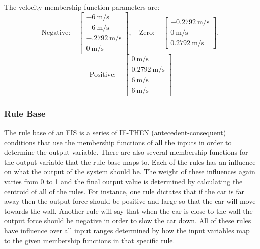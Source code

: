 The velocity membership function parameters are: \begin{displaymath} \mathrm{Negative:}\quad
\begin{bmatrix}
\SI{-6}{\metre\per\second}\\\SI{-6}{\metre\per\second}\\\SI{-.2792}{\metre\per\second}\\\SI{0}{\metre\per\second}
\end{bmatrix}, \quad \mathrm{Zero:}\quad \begin{bmatrix}
    \SI{-0.2792}{\metre\per\second}\\\SI{0}{\metre\per\second}\\\SI{0.2792}{\metre\per\second} \end{bmatrix},
\end{displaymath} \begin{displaymath} \mathrm{Positive:}\quad \begin{bmatrix}
\SI{0}{\metre\per\second}\\\SI{0.2792}{\metre\per\second}\\\SI{6}{\metre\per\second}\\\SI{6}{\metre\per\second}
\end{bmatrix} \end{displaymath} \subsubsection{Rule Base}\label{ss:rulebase} The rule base of an FIS is a
series of IF-THEN (antecedent-consequent) conditions that use the membership functions of all the inputs in
order to determine the output variable. There are also several membership functions for the output variable
that the rule base maps to. Each of the rules has an influence on what the output of the system should be. The
weight of these influences again varies from 0 to 1 and the final output value is determined by calculating
the centroid of all of the rules. For instance, one rule dictates that if the car is far away then the output
force should be positive and large so that the car will move towards the wall. Another rule will say that when
the car is close to the wall the output force should be negative in order to slow the car down. All of these
rules have influence over all input ranges determined by how the input variables map to the given membership
functions in that specific rule.

